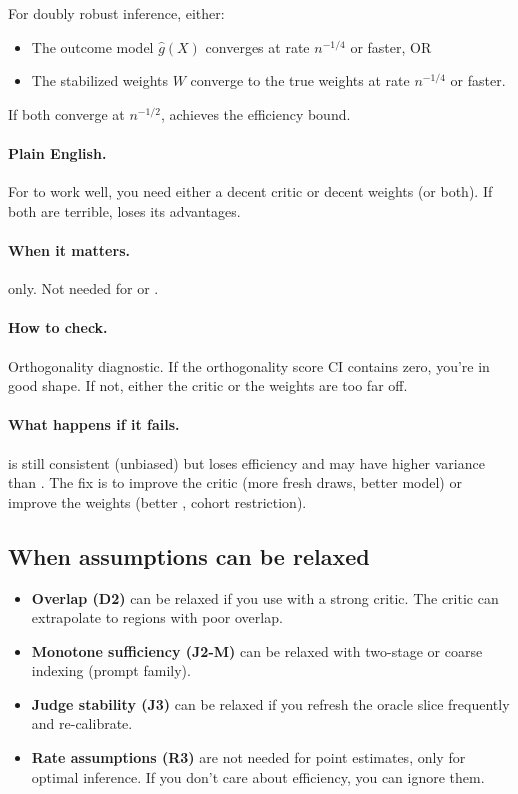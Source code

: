 \begin{assumption}
\label{assum:rates}
For doubly robust inference, either:
\begin{itemize}
\item The outcome model $\hat{g}(X)$ converges at rate $n^{-1/4}$ or faster, OR
\item The stabilized weights $W$ converge to the true weights at rate $n^{-1/4}$ or faster.
\end{itemize}
If both converge at $n^{-1/2}$, \dr{} achieves the efficiency bound.
\end{assumption}

\paragraph{Plain English.} For \dr{} to work well, you need either a decent critic or decent weights (or both). If both are terrible, \dr{} loses its advantages.

\paragraph{When it matters.} \dr{} only. Not needed for \dm{} or \ips.

\paragraph{How to check.} Orthogonality diagnostic. If the orthogonality score CI contains zero, you're in good shape. If not, either the critic or the weights are too far off.

\paragraph{What happens if it fails.} \dr{} is still consistent (unbiased) but loses efficiency and may have higher variance than \ips. The fix is to improve the critic (more fresh draws, better model) or improve the weights (better \simcal, cohort restriction).

\subsection{When assumptions can be relaxed}

\begin{itemize}
\item \textbf{Overlap (D2)} can be relaxed if you use \dr{} with a strong critic. The critic can extrapolate to regions with poor overlap.
\item \textbf{Monotone sufficiency (J2-M)} can be relaxed with two-stage \autocal{} or coarse indexing (prompt family).
\item \textbf{Judge stability (J3)} can be relaxed if you refresh the oracle slice frequently and re-calibrate.
\item \textbf{Rate assumptions (R3)} are not needed for point estimates, only for optimal inference. If you don't care about efficiency, you can ignore them.
\end{itemize}

